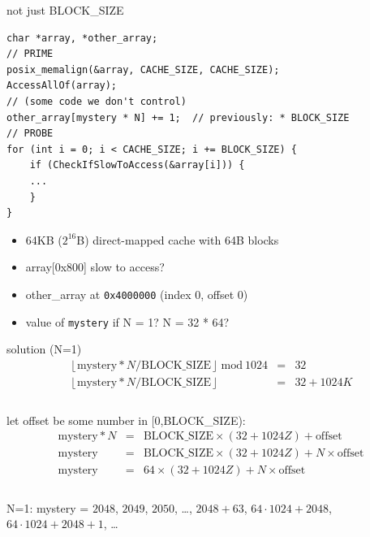 \begin{frame}[fragile]{not just BLOCK\_SIZE}
\begin{Verbatim}[fontsize=\fontsize{9}{10}]
char *array, *other_array;
// PRIME
posix_memalign(&array, CACHE_SIZE, CACHE_SIZE);
AccessAllOf(array);
// (some code we don't control)
other_array[mystery * N] += 1;  // previously: * BLOCK_SIZE
// PROBE
for (int i = 0; i < CACHE_SIZE; i += BLOCK_SIZE) {
    if (CheckIfSlowToAccess(&array[i])) {
    ...
    }
}
\end{Verbatim}
\begin{itemize}
\item 64KB ($2^{16}$B) direct-mapped cache with 64B blocks
\item array[0x800] slow to access?
\item other\_array at \texttt{0x4000000} (index 0, offset 0)
\item value of \texttt{mystery} if N = 1? N = 32 * 64?
\end{itemize}
\end{frame}

\begin{frame}{solution (N=1)}
\vspace{-1cm}
\[
\begin{align*}
\left\lfloor\text{mystery} * N / \text{BLOCK\_SIZE}\right\rfloor~\text{mod}~1024 & = & 32 \\
\left\lfloor\text{mystery} * N / \text{BLOCK\_SIZE}\right\rfloor & = & 32 + 1024K \\
\end{align*}
\]
\\
let offset be some number in [0,BLOCK\_SIZE): \\
\vspace{-1cm}
\[
\begin{align*}
\text{mystery} * N & = & \text{BLOCK\_SIZE}\times(32+1024Z) + \text{offset}\\
\text{mystery} & = & \text{BLOCK\_SIZE}\times(32+1024Z) + N\times\text{offset} \\
\text{mystery} & = & 64\times(32+1024Z)+N\times\text{offset} \\
\end{align*}
\]
\\
N=1: mystery = $2048$, $2049$, $2050$, \ldots, $2048+63$, $64\cdot1024+2048$, $64\cdot1024+2048+1$, \ldots
\end{frame}

